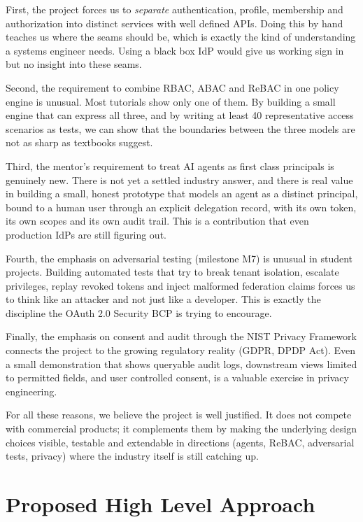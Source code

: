 \documentclass[11pt,a4paper]{article}
\begin{document}
First, the project forces us to \textit{separate} authentication, profile, membership and authorization into distinct services with well defined APIs. Doing this by hand teaches us where the seams should be, which is exactly the kind of understanding a systems engineer needs. Using a black box IdP would give us working sign in but no insight into these seams.

Second, the requirement to combine RBAC, ABAC and ReBAC in one policy engine is unusual. Most tutorials show only one of them. By building a small engine that can express all three, and by writing at least 40 representative access scenarios as tests, we can show that the boundaries between the three models are not as sharp as textbooks suggest.

Third, the mentor's requirement to treat AI agents as first class principals is genuinely new. There is not yet a settled industry answer, and there is real value in building a small, honest prototype that models an agent as a distinct principal, bound to a human user through an explicit delegation record, with its own token, its own scopes and its own audit trail. This is a contribution that even production IdPs are still figuring out.

Fourth, the emphasis on adversarial testing (milestone M7) is unusual in student projects. Building automated tests that try to break tenant isolation, escalate privileges, replay revoked tokens and inject malformed federation claims forces us to think like an attacker and not just like a developer. This is exactly the discipline the OAuth 2.0 Security BCP is trying to encourage.

Finally, the emphasis on consent and audit through the NIST Privacy Framework connects the project to the growing regulatory reality (GDPR, DPDP Act). Even a small demonstration that shows queryable audit logs, downstream views limited to permitted fields, and user controlled consent, is a valuable exercise in privacy engineering.

For all these reasons, we believe the project is well justified. It does not compete with commercial products; it complements them by making the underlying design choices visible, testable and extendable in directions (agents, ReBAC, adversarial tests, privacy) where the industry itself is still catching up.

\section{Proposed High Level Approach}
\end{document}

